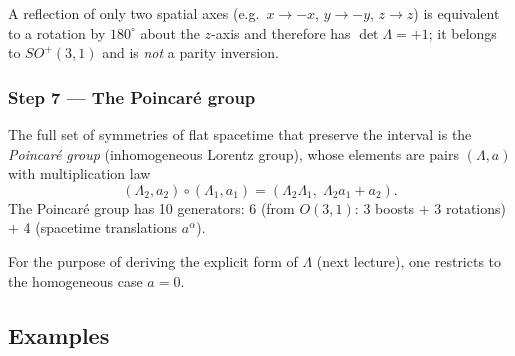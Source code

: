 \begin{remark}
A reflection of only two spatial axes (e.g.\ $x\to -x$, $y\to -y$,
$z\to z$) is equivalent to a rotation by $180^\circ$ about the $z$-axis
and therefore has $\det\Lambda = +1$; it belongs to $SO^+(3,1)$ and is
\emph{not} a parity inversion.
\end{remark}

\subsubsection*{Step 7 — The Poincaré group}

The full set of symmetries of flat spacetime that preserve the interval
is the \emph{Poincaré group} (inhomogeneous Lorentz group), whose
elements are pairs $(\Lambda, a)$ with multiplication law
\begin{equation}
  (\Lambda_2,a_2)\circ(\Lambda_1,a_1)
  = (\Lambda_2\Lambda_1,\; \Lambda_2 a_1 + a_2).
  \label{eq:lec03:poincare_mult}
\end{equation}
The Poincaré group has 10 generators: 6 (from $O(3,1)$: 3 boosts +
3 rotations) $+$ 4 (spacetime translations $a^\alpha$).

For the purpose of deriving the explicit form of $\Lambda$ (next
lecture), one restricts to the homogeneous case $a=0$.

\subsection*{Examples}



